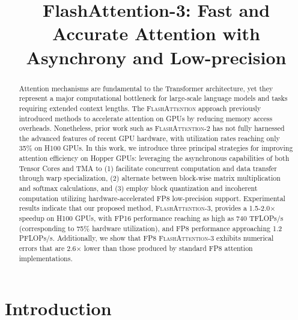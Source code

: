 \title{FlashAttention-3: Fast and Accurate Attention with Asynchrony and Low-precision}

\begin{abstract}
Attention mechanisms are fundamental to the Transformer architecture, yet they represent a major computational bottleneck for large-scale language models and tasks requiring extended context lengths. The \textsc{FlashAttention} approach previously introduced methods to accelerate attention on GPUs by reducing memory access overheads. Nonetheless, prior work such as \textsc{FlashAttention-2} has not fully harnessed the advanced features of recent GPU hardware, with utilization rates reaching only 35\% on H100 GPUs. In this work, we introduce three principal strategies for improving attention efficiency on Hopper GPUs: leveraging the asynchronous capabilities of both Tensor Cores and TMA to (1) facilitate concurrent computation and data transfer through warp specialization, (2) alternate between block-wise matrix multiplication and softmax calculations, and (3) employ block quantization and incoherent computation utilizing hardware-accelerated FP8 low-precision support. Experimental results indicate that our proposed method, \textsc{FlashAttention-3}, provides a 1.5-2.0$\times$ speedup on H100 GPUs, with FP16 performance reaching as high as 740 TFLOPs/s (corresponding to 75\% hardware utilization), and FP8 performance approaching 1.2 PFLOPs/s. Additionally, we show that FP8 \textsc{FlashAttention-3} exhibits numerical errors that are 2.6$\times$ lower than those produced by standard FP8 attention implementations.
\end{abstract}

\section{Introduction}
\label{sec:intro}

